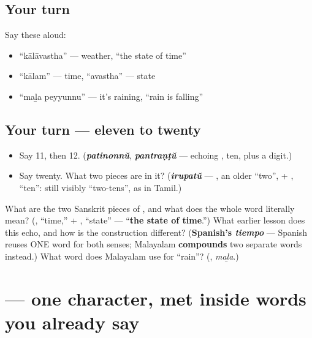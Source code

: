 \subsection*{Your turn}
Say these aloud:

\begin{itemize}
\raggedright
  \item \textquotedblleft{}kālāvastha\textquotedblright{} — weather, \textquotedblleft{}the state of time\textquotedblright{}
  \item \textquotedblleft{}kālam\textquotedblright{} — time, \textquotedblleft{}avastha\textquotedblright{} — state
  \item \textquotedblleft{}maḻa peyyunnu\textquotedblright{} — it's raining, \textquotedblleft{}rain is falling\textquotedblright{}
\end{itemize}

\subsection*{Your turn — eleven to twenty}
\begin{itemize}
\raggedright
  \item Say 11, then 12. (\emph{\textbf{patinonnŭ}}, \emph{\textbf{pantraṇṭŭ}} — echoing \textbf{}, ten, plus a digit.)
  \item Say twenty. What two pieces are in it? (\emph{\textbf{irupatŭ}} — \textbf{}, an older \textquotedblleft{}two\textquotedblright{}, + \textbf{}, \textquotedblleft{}ten\textquotedblright{}: still visibly \textquotedblleft{}two-tens\textquotedblright{}, as in Tamil.)
\end{itemize}

\begin{tcolorbox}[breakable,colback=teal!4,colframe=teal!35!black,title={Before you move on}]
What are the two Sanskrit pieces of \textbf{}, and what does the whole word literally mean? (\textbf{}, \textquotedblleft{}time,\textquotedblright{} + \textbf{}, \textquotedblleft{}state\textquotedblright{} — \textquotedblleft{}\textbf{the state of time}.\textquotedblright{}) What earlier lesson does this echo, and how is the construction different? (\textbf{Spanish's \emph{tiempo}} — Spanish reuses ONE word for both senses; Malayalam \textbf{compounds} two separate words instead.) What word does Malayalam use for \textquotedblleft{}rain\textquotedblright{}? (\textbf{}, \emph{maḻa}.)
\end{tcolorbox}
\section[\texorpdfstring{\ml{ദ} (da)}{ദ (da)}]{ — one character, met inside words you already say}

